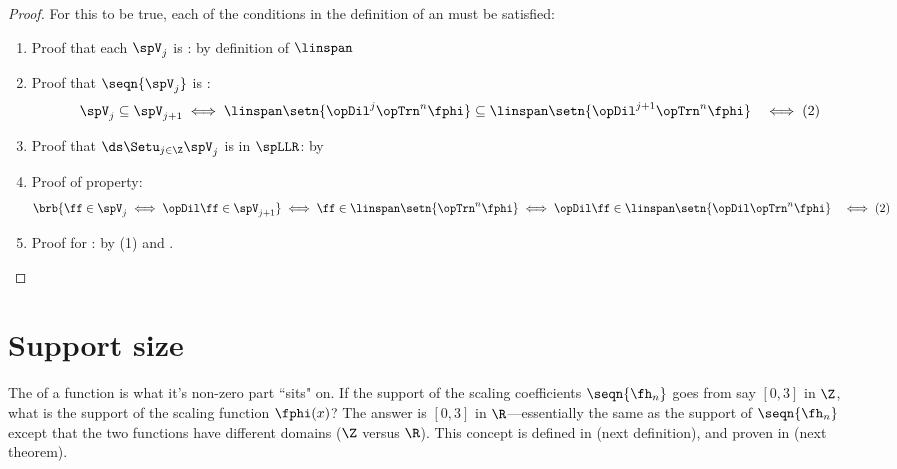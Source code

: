 \begin{proof}
For this to be true, each of the conditions in the definition of an   must be satisfied:
\begin{enumerate}
  \item Proof that each $\spV_j$ is : by definition of $\linspan$

  \item Proof that $\seqn{\spV_j}$ is :
    \begin{align*}
      \spV_j\subseteq\spV_{j+1}
        &\iff \linspan\setn{\opDil^j\opTrn^n\fphi}\subseteq\linspan\setn{\opDil^{j+1}\opTrn^n\fphi}
        &\iff (2)
    \end{align*}

  \item Proof that $\ds\Setu_{j\in\Z}\spV_j$ is  in $\spLLR$: by 

  \item Proof of  property:
    \begin{align*}
      \brb{\ff\in\spV_j\iff\opDil\ff\in\spV_{j+1}}
        &\iff \ff\in\linspan\setn{\opTrn^n\fphi}\iff\opDil\ff\in\linspan\setn{\opDil\opTrn^n\fphi}
        &\iff (2)
    \end{align*}

  \item Proof for : by (1) and .
\end{enumerate}
\end{proof}

\section{Support size}
The  of a function is what it's non-zero part ``sits" on.
If the support of the scaling coefficients $\seqn{\fh_n}$ goes from say
$[0,3]$ in $\Z$, what is the support of the scaling function $\fphi(x)$?
The answer is $[0,3]$ in $\R$---essentially the same
as the support of $\seqn{\fh_n}$ except that the two functions have different
domains ($\Z$ versus $\R$).
This concept is defined in  (next definition),
and proven in  (next theorem).

